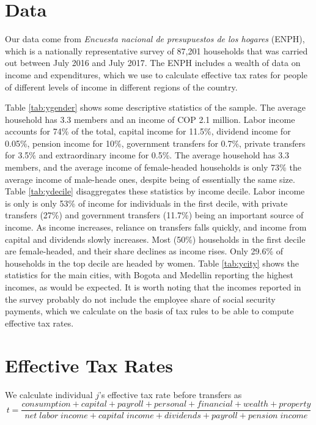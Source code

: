 \documentclass[12pt]{article}
\begin{document}
\section{Data}
Our data come from \textit{Encuesta nacional de presupuestos de los hogares} (ENPH), which is a nationally representative survey of 87,201 households that was carried out between July 2016 and July 2017.
The ENPH includes a wealth of data on income and expenditures, which we use to calculate effective tax rates for people of different levels of income in different regions of the country.

Table \ref{tab:ygender} shows some descriptive statistics of the sample.
The average household has 3.3 members and an income of COP 2.1 million.
Labor income accounts for 74\% of the total, capital income for 11.5\%, dividend income for 0.05\%, pension income for 10\%, government transfers for 0.7\%, private transfers for 3.5\% and extraordinary income for 0.5\%.
The average household has 3.3 members, and the average income of female-headed households is only 73\% the average income of male-heade ones, despite being of essentially the same size.
Table \ref{tab:ydecile} disaggregates these statistics by income decile.
Labor income is only is only 53\% of income for individuals in the first decile, with private transfers (27\%) and government transfers (11.7\%) being an important source of income.
As income increases, reliance on transfers falls quickly, and income from capital and dividends slowly increases.
Most (50\%) households in the first decile are female-headed, and their share declines as income rises.
Only 29.6\% of households in the top decile are headed by women.
Table \ref{tab:ycity} shows the statistics for the main cities, with Bogota and Medellin reporting the highest incomes, as would be expected.
It is worth noting that the incomes reported in the survey probably do not include the employee share of social security payments, which we calculate on the basis of tax rules to be able to compute effective tax rates.

\section{Effective Tax Rates}
We calculate individual $j$'s effective tax rate before transfers as
\begin{equation}
t=\frac{consumption + capital + payroll + personal + financial + wealth + property}{net \; labor \;income +capital \;income + dividends + payroll + pension \;income}
\end{equation}
\end{document}
